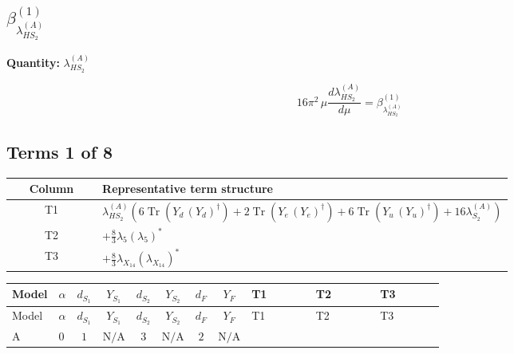 \documentclass[8pt]{article}
\begin{document}
\begin{landscape}
\section*{$\beta_{\lambda_{HS_2}^{(A)}}^{(1)}$}
\noindent\textbf{Quantity: }$\lambda_{HS_2}^{(A)}$\par\smallskip
\[16\pi^2\,\mu\frac{d \lambda_{HS_2}^{(A)}}{d\mu}=\beta_{\lambda_{HS_2}^{(A)}}^{(1)}\]
\subsection*{Terms 1 of 8}
\begin{center}
\begin{tabular}{@{}c >{\raggedright\arraybackslash}p{0.82\linewidth}@{}}
\toprule
Column & Representative term structure \\
\midrule
T1 & \(\displaystyle {\lambda_{HS_2}^{(A)}} (6 \operatorname{Tr}\!\left({Y_d}\,\left({Y_d}\right)^{\dagger}\right)+2 \operatorname{Tr}\!\left({Y_e}\,\left({Y_e}\right)^{\dagger}\right)+6 \operatorname{Tr}\!\left({Y_u}\,\left({Y_u}\right)^{\dagger}\right)+16 {\lambda_{S_2}^{(A)}})\) \\
\midrule
T2 & \(\displaystyle +\frac{8}{3} {\lambda_5} \left({\lambda_5}\right)^{*}\) \\
\midrule
T3 & \(\displaystyle +\frac{8}{3} {\lambda_{X_{14}}} \left({\lambda_{X_{14}}}\right)^{*}\) \\
\midrule
\bottomrule
\end{tabular}
\end{center}
\smallskip
\tiny
\begin{longtable}{@{}llcccccc >{\raggedright\arraybackslash}p{0.21\linewidth} >{\raggedright\arraybackslash}p{0.21\linewidth} >{\raggedright\arraybackslash}p{0.21\linewidth}@{}}
\toprule
Model & $\alpha$ & $d_{S_1}$ & $Y_{S_1}$ & $d_{S_2}$ & $Y_{S_2}$ & $d_F$ & $Y_F$ & T1 & T2 & T3 \\
\midrule
\endfirsthead
\toprule
Model & $\alpha$ & $d_{S_1}$ & $Y_{S_1}$ & $d_{S_2}$ & $Y_{S_2}$ & $d_F$ & $Y_F$ & T1 & T2 & T3 \\
\midrule
\endhead
A & $0$ & $1$ & $\text{N/A}$ & $3$ & $\text{N/A}$ & $2$ & $\text{N/A}$ & \scriptsize\adjustbox{max width=\linewidth}{$\begin{gathered} {\lambda_{HS_2}^{(A)}} (6 \operatorname{Tr}\!\left({Y_d}\,\left({Y_d}\right)^{\dagger}\right)+2 \operatorname{Tr}\!\left({Y_e}\,\left({Y_e}\right)^{\dagger}\right)+6 \operatorname{Tr}\!\left({Y_u}\,\left({Y_u}\right)^{\dagger}\right)+16 {\lambda_{S_2}^{(A)}})\end{gathered}$} & \scriptsize\adjustbox{max width=\linewidth}{$\begin{gathered} +\frac{8}{3} {\lambda_5} \left({\lambda_5}\right)^{*}\end{gathered}$} & \scriptsize\adjustbox{max width=\linewidth}{$\begin{gathered} +\frac{8}{3} {\lambda_{X_{14}}} \left({\lambda_{X_{14}}}\right)^{*}\end{gathered}$} \\

\end{longtable}
\end{landscape}
\end{document}
